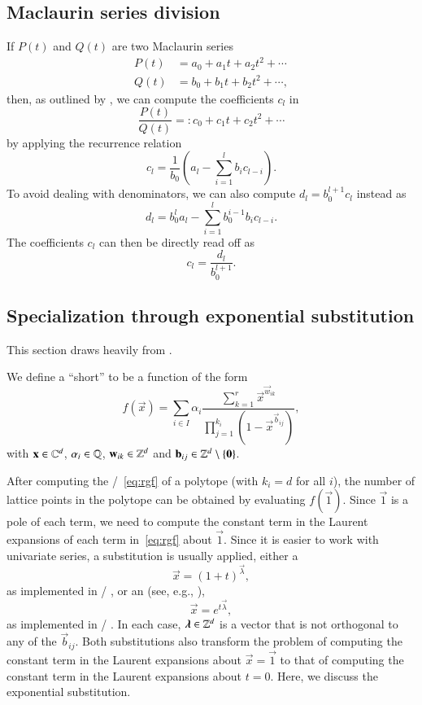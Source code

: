 \subsection{Maclaurin series division}
\label{s:division}

If $P(t)$ and $Q(t)$ are two Maclaurin series
\begin{align*}
P(t) & =  a_0 + a_1 t + a_2 t^2 + \cdots \\
Q(t) & =  b_0 + b_1 t + b_2 t^2 + \cdots
,
\end{align*}
then, as outlined by ,
we can compute the coefficients $c_l$ in
$$
\frac{P(t)}{Q(t)} =: c_0 + c_1 t + c_2 t^2 + \cdots
$$
by applying the recurrence relation
$$
c_l = \frac 1 {b_0} \left( a_l - \sum_{i=1}^l b_i c_{l-i} \right)
.
$$
To avoid dealing with denominators, we can also compute
$d_l = b_0^{l+1} c_l$ instead as
$$
d_l = b_0^l a_l - \sum_{i=1}^l b_0^{i-1} b_i c_{l-i}
.
$$
The coefficients $c_l$ can then be directly read off as
$$
c_l = \frac{d_l}{b_0^{l+1}}
.
$$

\subsection{Specialization through exponential substitution}
\label{s:exponential}

This section draws heavily from .

We define a ``short''  to be a function of the form
\begin{equation}
\label{eq:rgf}
f(\vec x)=
\sum_{i\in I}\alpha_i
    \frac{\sum_{k=1}^{r} \vec x^{\vec w_{ik} }}
	 {\prod_{j=1}^{k_i}\left(1-\vec x^{\vec b_{ij}}\right)}
,
\end{equation}
with $\vec x \in \CC^d$, $\alpha_i \in \mathbb{Q}$,
$\vec w_{i k} \in \ZZ^d$ and $\vec b_{i j} \in \ZZ^d \setminus \{\vec 0\}$.

After computing the \rgf/~\eqref{eq:rgf} of a polytope
(with $k_i = d$ for all $i$),
the number of lattice points in the polytope can be obtained
by evaluating $f(\vec 1)$.  Since $\vec 1$ is a pole of each
term, we need to compute the constant term in the Laurent expansions
of each term in~\eqref{eq:rgf} about $\vec 1$.
Since it is easier to work with univariate series, a substitution is usually
applied, either a 
$$
\vec x = (1+t)^{\vec \lambda}
,
$$
as implemented in \LattE/ ,
or an  (see, e.g., ),
$$
\vec x = e^{t \vec \lambda}
,
$$
as implemented in \LattEmk/ .
In each case, $\vec \lambda \in \ZZ^d$ is a vector that is not orthogonal
to any of the $\vec b_{ij}$.
Both substitutions also transform the problem of computing the
constant term in the Laurent expansions about $\vec x = \vec 1$
to that of computing the constant term in the
Laurent expansions about $t = 0$.
Here, we discuss the exponential substitution.

